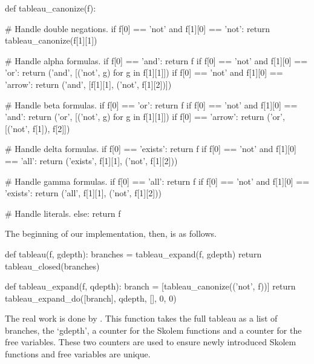 \documentclass[a4paper,notitlepage]{scrartcl}
\begin{document}
\begin{code}
def tableau_canonize(f):

    # Handle double negations.
    if f[0] == 'not' and f[1][0] == 'not':
        return tableau_canonize(f[1][1])

    # Handle alpha formulas.
    if f[0] == 'and':
        return f 
    if f[0] == 'not' and f[1][0] == 'or':
        return ('and', [('not', g) for g in f[1][1]])
    if f[0] == 'not' and f[1][0] == 'arrow':
        return ('and', [f[1][1], ('not', f[1][2])])

    # Handle beta formulas.
    if f[0] == 'or':
        return f 
    if f[0] == 'not' and f[1][0] == 'and':
        return ('or', [('not', g) for g in f[1][1]])
    if f[0] == 'arrow':
        return ('or', [('not', f[1]), f[2]])

    # Handle delta formulas.
    if f[0] == 'exists':
        return f 
    if f[0] == 'not' and f[1][0] == 'all':
        return ('exists', f[1][1], ('not', f[1][2]))

    # Handle gamma formulas.
    if f[0] == 'all':
        return f
    if f[0] == 'not' and f[1][0] == 'exists':
        return ('all', f[1][1], ('not', f[1][2]))

    # Handle literals. 
    else:
        return f 
\end{code}

The beginning of our implementation, then, is as follows.

\begin{code}
def tableau(f, gdepth):
    branches = tableau_expand(f, gdepth)
    return tableau_closed(branches)

def tableau_expand(f, qdepth):
    branch = [tableau_canonize(('not', f))]
    return tableau_expand_do([branch], qdepth, [], 0, 0)
\end{code}

The real work is done by . This function takes the
full tableau as a list of branches, the `gdepth', a counter for the Skolem
functions and a counter for the free variables. These two counters are used to
ensure newly introduced Skolem functions and free variables are unique.
\end{document}
